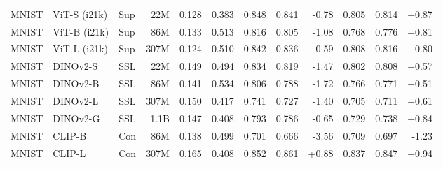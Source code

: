 \begin{table}[!htbp]
\begin{tabular}{lllrrr|rrr|rrr}
MNIST & ViT-S (i21k) & Sup & 22M & 0.128 & 0.383 & 0.848 & 0.841 & -0.78 & 0.805 & 0.814 & +0.87 \\
MNIST & ViT-B (i21k) & Sup & 86M & 0.133 & 0.513 & 0.816 & 0.805 & -1.08 & 0.768 & 0.776 & +0.81 \\
MNIST & ViT-L (i21k) & Sup & 307M & 0.124 & 0.510 & 0.842 & 0.836 & -0.59 & 0.808 & 0.816 & +0.80 \\
MNIST & DINOv2-S & SSL & 22M & 0.149 & 0.494 & 0.834 & 0.819 & -1.47 & 0.802 & 0.808 & +0.57 \\
MNIST & DINOv2-B & SSL & 86M & 0.141 & 0.534 & 0.806 & 0.788 & -1.72 & 0.766 & 0.771 & +0.51 \\
MNIST & DINOv2-L & SSL & 307M & 0.150 & 0.417 & 0.741 & 0.727 & -1.40 & 0.705 & 0.711 & +0.61 \\
MNIST & DINOv2-G & SSL & 1.1B & 0.147 & 0.408 & 0.793 & 0.786 & -0.65 & 0.729 & 0.738 & +0.84 \\
MNIST & CLIP-B & Con & 86M & 0.138 & 0.499 & 0.701 & 0.666 & -3.56 & 0.709 & 0.697 & -1.23 \\
MNIST & CLIP-L & Con & 307M & 0.165 & 0.408 & 0.852 & 0.861 & +0.88 & 0.837 & 0.847 & +0.94 \\
\bottomrule
\end{tabular}
\end{table}
